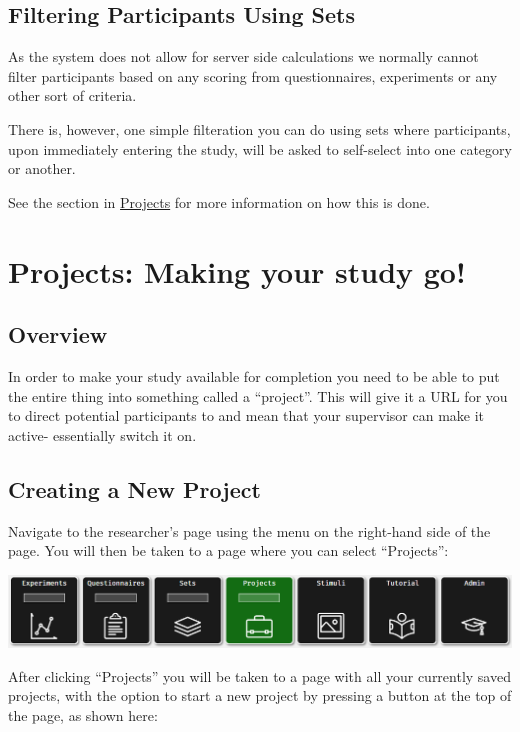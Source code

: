 \documentclass[]{book}
\begin{document}
\section{Filtering Participants Using
Sets}\label{filtering-participants-using-sets}

As the system does not allow for server side calculations we normally
cannot filter participants based on any scoring from questionnaires,
experiments or any other sort of criteria.

There is, however, one simple filteration you can do using sets where
participants, upon immediately entering the study, will be asked to
self-select into one category or another.

See the section in \protect\hyperlink{filtering}{Projects} for more
information on how this is done.

\chapter{Projects: Making your study
go!}\label{projects-making-your-study-go}

\section{Overview}\label{overview-6}

In order to make your study available for completion you need to be able
to put the entire thing into something called a ``project''. This will
give it a URL for you to direct potential participants to and mean that
your supervisor can make it active- essentially switch it on.

\section{Creating a New Project}\label{creating-a-new-project}

Navigate to the researcher's page using the menu on the right-hand side
of the page. You will then be taken to a page where you can select
``Projects'':

\includegraphics{images/screenshots/proj_1.png}

After clicking ``Projects'' you will be taken to a page with all your
currently saved projects, with the option to start a new project by
pressing a button at the top of the page, as shown here:
\end{document}
